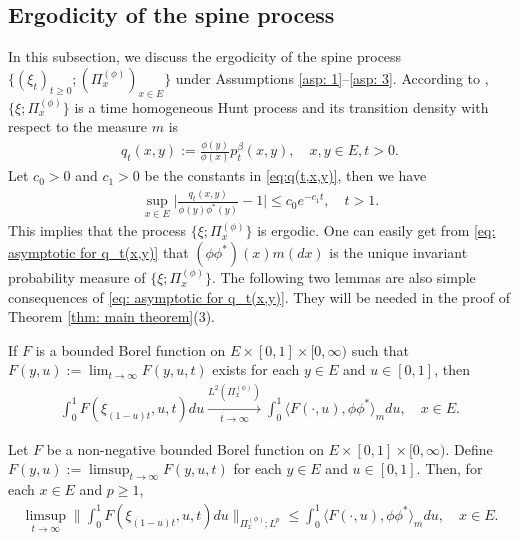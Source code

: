 \subsection{Ergodicity of the spine process}
\label{sec: Ergodicity}
	In this subsection, we discuss the ergodicity of the spine process $\{(\xi_t)_{t\geq 0}; (\Pi^{(\phi)}_x)_{x\in E}\}$ under Assumptions \ref{asp: 1}--\ref{asp: 3}.
	According to \cite{KimSong2008Intrinsic}, $\{\xi; \Pi^{(\phi)}_x\}$ is a time homogeneous Hunt process and its transition density with respect to the measure $m$ is
\begin{align}
	q_t(x,y) := \frac{\phi(y)}{\phi(x)} p^\beta_t(x,y),
	\quad x,y\in E, t>0.
\end{align}
	Let $c_0>0$ and $c_1>0$ be the constants  in \eqref{eq:q(t,x,y)}, then we have
\begin{align}\label{eq: asymptotic for q_t(x,y)}
	\sup_{x\in E} \Big| \frac{q_t(x,y)}{\phi(y)\phi^*(y)} - 1\Big|
	\leq c_0 e^{-c_1 t},
	\quad t > 1.
\end{align}
	This implies that the process $\{\xi; \Pi^{(\phi)}_x\}$ is ergodic.
	One can easily get from \eqref{eq: asymptotic for q_t(x,y)} that $(\phi\phi^*)(x)m(dx)$ is the unique invariant probability measure of $\{\xi; \Pi^{(\phi)}_x\}$.
	The following two lemmas are also simple consequences of \eqref{eq: asymptotic for q_t(x,y)}.
	They will be needed in the proof of  Theorem \ref{thm: main theorem}(3).
\begin{lem} \label{lem: ergodicity of the underlying process}
	If $F$ is a bounded Borel function on $E\times [0,1]\times [0,\infty)$ such that $F(y,u):= \lim_{t\to \infty} F(y,u,t)$ exists for each $y\in E$ and $u \in [0,1]$,
	then
\begin{align}
	\int_0^1 F(\xi_{(1-u)t},u,t) du
	\xrightarrow[t\to \infty]{ L^2(\Pi_x^{(\phi)})}
	\int_0^1 \langle F(\cdot , u), \phi\phi^*\rangle_m du,
	\quad x\in E.
\end{align}
\end{lem}
\begin{lem}\label{lem: Fatou-ergodic lemma for the uderlying process}
	Let $F$ be a non-negative bounded Borel function on $E\times [0,1]\times [0,\infty)$.
	Define $F(y,u):= \limsup_{t\to \infty} F(y,u,t)$ for each $y\in E$ and $u \in [0,1]$.
	Then, for each $x\in E$ and $p \geq 1$,
\begin{align}
	\limsup_{ t \to \infty}  \Big\| \int_0^1 F(\xi_{(1-u) t },u,t) du  \Big\|_{\Pi_x^{(\phi)};L^p}
	\leq \int_0^1 \langle F(\cdot, u), \phi \phi^*\rangle_m du,
	\quad x\in E.
\end{align}
\end{lem}

